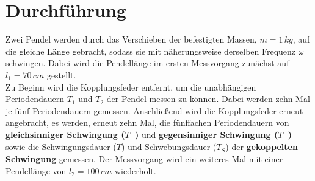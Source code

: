 \section{Durchführung}
Zwei Pendel werden durch das Verschieben der befestigten Massen, $m=1\,\si{kg}$, auf die gleiche Länge gebracht, sodass sie mit näherungsweise derselben Frequenz $ω$ schwingen.
Dabei wird die Pendellänge im ersten Messvorgang zunächst auf $l_1=70\,\si{cm}$ gestellt. \\

Zu Beginn wird die Kopplungsfeder entfernt, um die unabhängigen Periodendauern $T_1$ und $T_2$ der Pendel messen zu können. Dabei werden zehn Mal je fünf Periodendauern gemessen.
Anschließend wird die Kopplungsfeder erneut angebracht, es werden, erneut zehn Mal, die fünffachen Periodendauern von \textbf{gleichsinniger Schwingung ($T_+$)} und \textbf{gegensinniger Schwingung ($T_-$)} 
sowie die Schwingungsdauer ($T$) und Schwebungsdauer ($T_S$) der \textbf{gekoppelten Schwingung} gemessen.
Der Messvorgang wird ein weiteres Mal mit einer Pendellänge von $l_2=100\,\si{cm}$ wiederholt.
\label{sec:Durchführung}

